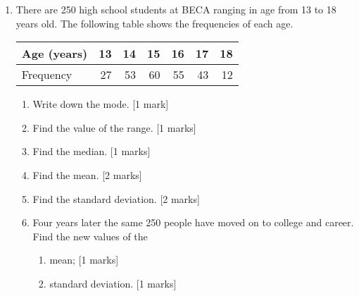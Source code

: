 \documentclass[12pt, twoside]{article}
\begin{document}
\begin{enumerate}
\newpage
\item There are 250 high school students at BECA ranging in age from 13 to 18 years old. The following table shows the frequencies of each age.
  \begin{center}
  \begin{tabular}{|l|r|r|r|r|r|r|}
    \hline
    Age (years) & 13 & 14 & 15 & 16 & 17 & 18\\ 
    \hline 
    Frequency & 27 & 53 & 60 & 55 & 43 & 12\\ 
    \hline 
    \end{tabular}
  \end{center}
  \begin{enumerate}
    \item Write down the mode. \hfill [1 mark] \vspace{1.5cm}
    \item Find the value of the range. \hfill [1 marks] \vspace{1.5cm}
    \item Find the median. \hfill [1 marks] \vspace{1.5cm}
    \item Find the mean. \hfill [2 marks] \vspace{1.5cm}
    \item Find the standard deviation. \hfill [2 marks] \vspace{1.5cm}
    \item Four years later the same 250 people have moved on to college and career. Find the new values of the 
    \begin{enumerate}
      \item mean; \hfill [1 marks] \vspace{1.5cm}
      \item standard deviation. \hfill [1 marks]
    \end{enumerate}
  \end{enumerate}

\end{enumerate}
\end{document}
